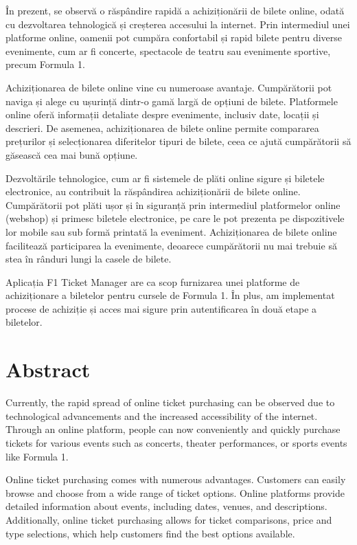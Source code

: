 În prezent, se observă o răspândire rapidă a achiziționării de bilete online, odată cu dezvoltarea tehnologică și creșterea accesului la internet. Prin intermediul unei platforme online, oamenii pot cumpăra confortabil și rapid bilete pentru diverse evenimente, cum ar fi concerte, spectacole de teatru sau evenimente sportive, precum Formula 1.

Achiziționarea de bilete online vine cu numeroase avantaje. Cumpărătorii pot naviga și alege cu ușurință dintr-o gamă largă de opțiuni de bilete. Platformele online oferă informații detaliate despre evenimente, inclusiv date, locații și descrieri. De asemenea, achiziționarea de bilete online permite compararea prețurilor și selecționarea diferitelor tipuri de bilete, ceea ce ajută cumpărătorii să găsească cea mai bună opțiune.

Dezvoltările tehnologice, cum ar fi sistemele de plăti online sigure și biletele electronice, au contribuit la răspândirea achiziționării de bilete online. Cumpărătorii pot plăti ușor și în siguranță prin intermediul platformelor online (webshop) și primesc biletele electronice, pe care le pot prezenta pe dispozitivele lor mobile sau sub formă printată la eveniment. Achiziționarea de bilete online facilitează participarea la evenimente, deoarece cumpărătorii nu mai trebuie să stea în rânduri lungi la casele de bilete.

Aplicația F1 Ticket Manager are ca scop furnizarea unei platforme de achiziționare a biletelor pentru cursele de Formula 1. În plus, am implementat procese de achiziție și acces mai sigure prin autentificarea în două etape a biletelor.

\vfill
{}

\chapter*{Abstract}

Currently, the rapid spread of online ticket purchasing can be observed due to technological advancements and the increased accessibility of the internet. Through an online platform, people can now conveniently and quickly purchase tickets for various events such as concerts, theater performances, or sports events like Formula 1.

Online ticket purchasing comes with numerous advantages. Customers can easily browse and choose from a wide range of ticket options. Online platforms provide detailed information about events, including dates, venues, and descriptions. Additionally, online ticket purchasing allows for ticket comparisons, price and type selections, which help customers find the best options available.

